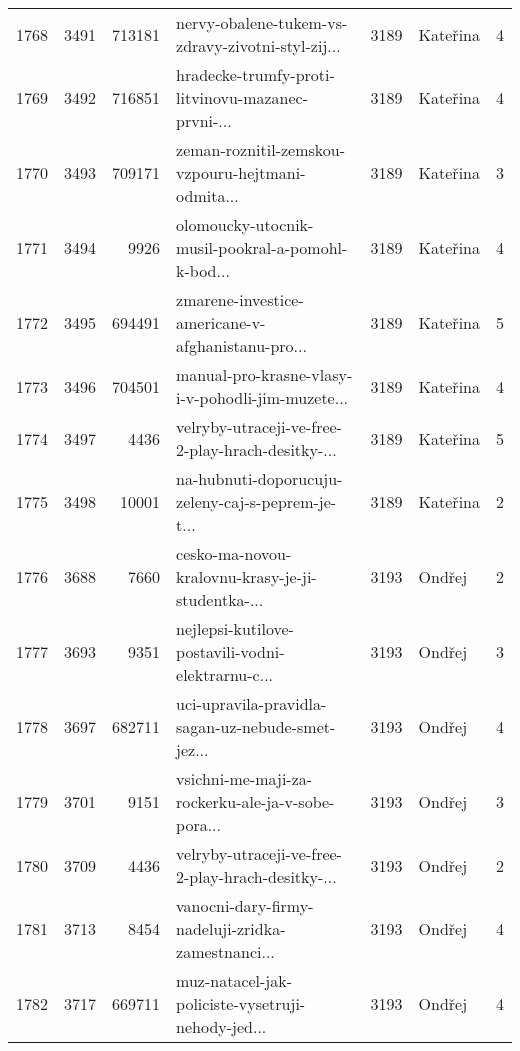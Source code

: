 \begin{tabular}{lrrlrlr}
1768 &       3491 &   713181 &  nervy-obalene-tukem-vs-zdravy-zivotni-styl-zij... &     3189 &                     Kateřina &               4 \\
1769 &       3492 &   716851 &  hradecke-trumfy-proti-litvinovu-mazanec-prvni-... &     3189 &                     Kateřina &               4 \\
1770 &       3493 &   709171 &  zeman-roznitil-zemskou-vzpouru-hejtmani-odmita... &     3189 &                     Kateřina &               3 \\
1771 &       3494 &     9926 &  olomoucky-utocnik-musil-pookral-a-pomohl-k-bod... &     3189 &                     Kateřina &               4 \\
1772 &       3495 &   694491 &  zmarene-investice-americane-v-afghanistanu-pro... &     3189 &                     Kateřina &               5 \\
1773 &       3496 &   704501 &  manual-pro-krasne-vlasy-i-v-pohodli-jim-muzete... &     3189 &                     Kateřina &               4 \\
1774 &       3497 &     4436 &  velryby-utraceji-ve-free-2-play-hrach-desitky-... &     3189 &                     Kateřina &               5 \\
1775 &       3498 &    10001 &  na-hubnuti-doporucuju-zeleny-caj-s-peprem-je-t... &     3189 &                     Kateřina &               2 \\
1776 &       3688 &     7660 &  cesko-ma-novou-kralovnu-krasy-je-ji-studentka-... &     3193 &                       Ondřej &               2 \\
1777 &       3693 &     9351 &  nejlepsi-kutilove-postavili-vodni-elektrarnu-c... &     3193 &                       Ondřej &               3 \\
1778 &       3697 &   682711 &  uci-upravila-pravidla-sagan-uz-nebude-smet-jez... &     3193 &                       Ondřej &               4 \\
1779 &       3701 &     9151 &  vsichni-me-maji-za-rockerku-ale-ja-v-sobe-pora... &     3193 &                       Ondřej &               3 \\
1780 &       3709 &     4436 &  velryby-utraceji-ve-free-2-play-hrach-desitky-... &     3193 &                       Ondřej &               2 \\
1781 &       3713 &     8454 &  vanocni-dary-firmy-nadeluji-zridka-zamestnanci... &     3193 &                       Ondřej &               4 \\
1782 &       3717 &   669711 &  muz-natacel-jak-policiste-vysetruji-nehody-jed... &     3193 &                       Ondřej &               4 \\

\end{tabular}
